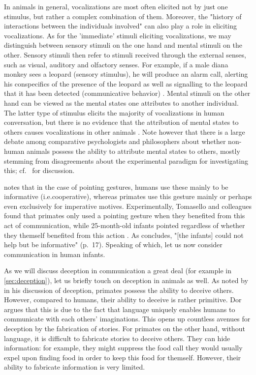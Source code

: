 In animals in general, vocalizations are most often elicited not by just one stimulus, but rather a complex combination of them. Moreover, the "history of interactions between the individuals involved" \citep[p.~151]{SeyfarthCheney03} can also play a role in eliciting vocalizations. As for the 'immediate' stimuli eliciting vocalizations, we may distinguish between sensory stimuli on the one hand and mental stimuli on the other. Sensory stimuli then refer to stimuli received through the external senses, such as visual, auditory and olfactory senses.
For example, if a male diana monkey sees a leopard (sensory stimulus), he will produce an alarm call, alerting his conspecifics of the presence of the leopard as well as signalling to the leopard that it has been detected (communicative behavior) \citep{Zuberbuhler97}.
Mental stimuli on the other hand can be viewed as the mental states one attributes to another individual.
The latter type of stimulus elicits the majority of vocalizations in human conversation, but there is no evidence that the attribution of mental states to others causes vocalizations in other animals \citep{SeyfarthCheney03}. Note however that there is a large debate among comparative psychologists and philosophers about whether non-human animals possess the ability to attribute mental states to others, mostly stemming from disagreements about the experimental paradigm for investigating this; cf.~\citet[Chapter~6]{Andrews15} for discussion.

\citet{Tomasello09} notes that in the case of pointing gestures, humans use these mainly to be informative (i.e.\@ cooperative), whereas primates use this gesture mainly or perhaps even exclusively for imperative motives. Experimentally, Tomasello and colleagues found that primates only used a pointing gesture when they benefited from this act of communication, while 25-month-old infants pointed regardless of whether they themself benefited from this action \citep{Bullinger11}. As \citet{Tomasello09} concludes, "[the infants] could not help but be informative" (p.~17). Speaking of which, let us now consider communication in human infants.

As we will discuss deception in communication a great deal (for example in \cref{sec:deception}), let us briefly touch on deception in animals as well. As noted by \citet{Dor17} in his discussion of deception, primates possess the ability to deceive others.
However, compared to humans, their ability to deceive is rather primitive. Dor argues that this is due to the fact that language uniquely enables humans to communicate with each others' imaginations. This opens up countless avenues for deception by the fabrication of stories. For primates on the other hand, without language, it is difficult to fabricate stories to deceive others. They can hide information: for example, they might suppress the food call they would usually expel upon finding food in order to keep this food for themself. However, their ability to fabricate information is very limited.

